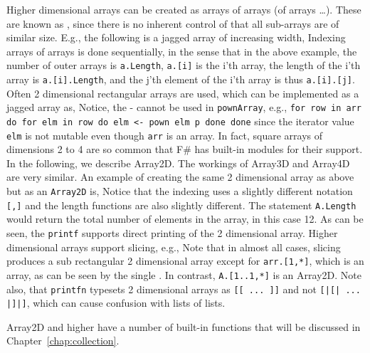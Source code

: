 Higher dimensional arrays can be created as arrays of arrays (of arrays \dots). These are known as , since there is no inherent control of that all sub-arrays are of similar size. E.g., the following is a jagged array of increasing width,
%
%
Indexing arrays of arrays is done sequentially, in the sense that in the above example, the number of outer arrays is \lstinline|a.Length|,  \lstinline|a.[i]| is the i'th array, the length of the i'th array is \lstinline|a.[i].Length|, and the j'th element of the i'th array is thus \lstinline|a.[i].[j]|. Often 2 dimensional rectangular arrays are used, which can be implemented as a jagged array as,
%
%
Notice, the - cannot be used in \lstinline!pownArray!, e.g., \lstinline{for row in arr do for elm in row do elm <- pown elm p done done} since the iterator value \lstinline!elm! is not mutable even though \lstinline!arr! is an array.
%
In fact, square arrays of dimensions 2 to 4 are so common that F\# has built-in modules for their support. In the following, we describe Array2D. The workings of Array3D and Array4D are very similar. An example of creating the same 2 dimensional array as above but as an \lstinline{Array2D} is,
%
%
Notice that the indexing uses a slightly different notation \lstinline|[,]| and the length functions are also slightly different. The statement \lstinline|A.Length| would return the total number of elements in the array, in this case 12. As can be seen, the \lstinline!printf! supports direct printing of the 2 dimensional array. Higher dimensional arrays support slicing, e.g.,
%
%
Note that in almost all cases, slicing produces a sub rectangular 2 dimensional array except for \lstinline{arr.[1,*]}, which is an array, as can be seen by the single \lexeme{[}. In contrast, \lstinline{A.[1..1,*]} is an Array2D. Note also, that \lstinline!printfn! typesets 2 dimensional arrays as \lstinline{[[ ... ]]} and not \lstinline{[|[| ... |]|]}, which can cause confusion with lists of lists.

Array2D and higher have a number of built-in functions that will be discussed in Chapter~\ref{chap:collection}.


